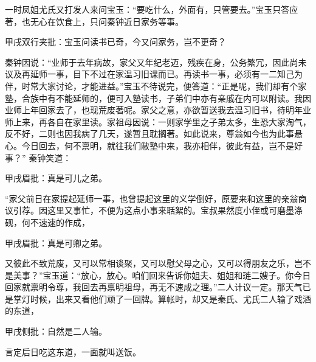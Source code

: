 \begin{parag}


    一时凤姐尤氏又打发人来问宝玉：“要吃什么，外面有，只管要去。”宝玉只答应著，也无心在饮食上，只问秦钟近日家务等事。\begin{note}甲戌双行夹批：宝玉问读书已奇，今又问家务，岂不更奇？\end{note}秦钟因说：“业师于去年病故，家父又年纪老迈，残疾在身，公务繁冗，因此尚未议及再延师一事，目下不过在家温习旧课而已。再读书一事，必须有一二知己为伴，时常大家讨论，才能进益。”宝玉不待说完，便答道：“正是呢，我们却有个家塾，合族中有不能延师的，便可入塾读书，子弟们中亦有亲戚在内可以附读。我因业师上年回家去了，也现荒废著呢。家父之意，亦欲暂送我去温习旧书，待明年业师上来，再各自在家里读。家祖母因说：一则家学里之子弟太多，生恐大家淘气，反不好，二则也因我病了几天，遂暂且耽搁著。如此说来，尊翁如今也为此事悬心。今日回去，何不禀明，就往我们敝塾中来，我亦相伴，彼此有益，岂不是好事？” 秦钟笑道：\begin{note}甲戌眉批：真是可儿之弟。\end{note}“家父前日在家提起延师一事，也曾提起这里的义学倒好，原要来和这里的亲翁商议引荐。因这里又事忙，不便为这点小事来聒絮的。宝叔果然度小侄或可磨墨涤砚，何不速速的作成，\begin{note}甲戌眉批：真是可卿之弟。\end{note}又彼此不致荒废，又可以常相谈聚，又可以慰父母之心，又可以得朋友之乐，岂不是美事？”宝玉道：“放心，放心。咱们回来告诉你姐夫、姐姐和琏二嫂子。你今日回家就禀明令尊，我回去再禀明祖母，再无不速成之理。”二人计议一定。那天气已是掌灯时候，出来又看他们顽了一回牌。算帐时，却又是秦氏、尤氏二人输了戏酒的东道，\begin{note}甲戌侧批：自然是二人输。\end{note}言定后日吃这东道，一面就叫送饭。
\end{parag}


